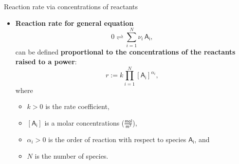 \begin{frame}[shrink]{Reaction rate via concentrations of reactants}
%
\begin{itemize}
\item \alert{\bf Reaction rate for general equation}
%
\[0 \rightleftharpoons \sum_{i=1}^{N} \nu_i \, \mathsf{A_i},\]
%
can be defined {\bf proportional to the concentrations of the reactants raised to a power}:
%
\[r := k \prod_{i=1}^{N} [\mathsf{A_i}]^{\alpha_i},\]
%
where
%
\begin{itemize}
	\item $k > 0$ is the rate coefficient, 
	\item $[\mathsf{A_i}]$ is a molar concentrations ($\mathsf{\tfrac{mol}{m^3}}$), 
	\item $\alpha_i > 0$ is the order of reaction with respect to species $\mathsf{A_i}$, %
	and 
	\item $N$ is the number of species.
\end{itemize}
%
\end{itemize}
%
\end{frame}
%
%
